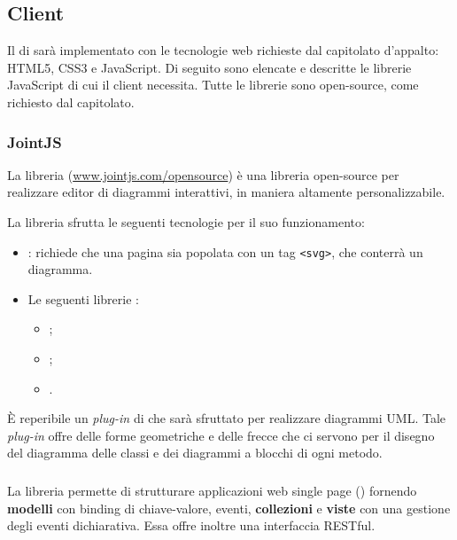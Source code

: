 


\subsection{Client} \label{sec:tech_client}
Il  di \proj{} sarà implementato con le tecnologie web richieste dal capitolato d'appalto: HTML5, CSS3 e JavaScript. Di seguito sono elencate e descritte le librerie JavaScript di cui il client necessita. Tutte le librerie sono open-source, come richiesto dal capitolato.

\subsubsection{JointJS}
La libreria \jointjs{} (\url{www.jointjs.com/opensource}) è una libreria open-source per realizzare editor di diagrammi interattivi, in maniera altamente personalizzabile.

La libreria sfrutta le seguenti tecnologie per il suo funzionamento:
\begin{itemize}
	\item \html: \jointjs{} richiede che una pagina \html{} sia popolata con un tag \texttt{<svg>}, che conterrà un diagramma.
	\item Le seguenti librerie \js:
	\begin{itemize}
		\item \jquery;
		\item \lodash;
		\item \backbonejs.
	\end{itemize}
\end{itemize}

È reperibile un \emph{plug-in} di \jointjs{} che sarà sfruttato per realizzare diagrammi UML. Tale \emph{plug-in} offre delle forme geometriche e delle frecce che ci servono per il disegno del diagramma delle classi e dei diagrammi a blocchi di ogni metodo.

\subsubsection{\backbonejs}
La libreria \backbonejs{} permette di strutturare applicazioni web single page () fornendo \textbf{modelli} con binding di chiave-valore, eventi, \textbf{collezioni} e \textbf{viste} con una gestione degli eventi dichiarativa. Essa offre inoltre una interfaccia RESTful.

